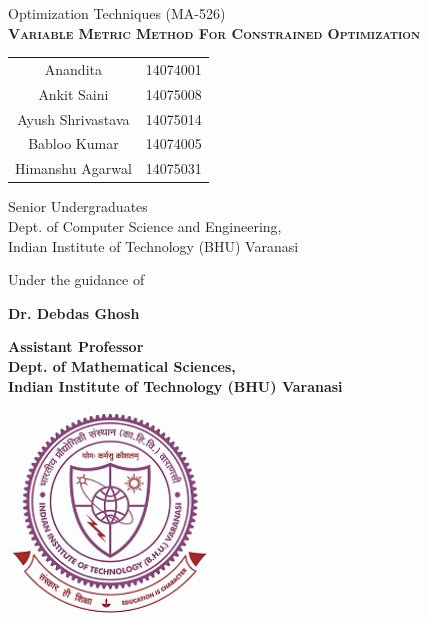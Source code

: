 \documentclass{article}
\begin{document}
\begin{titlepage}
    \begin{center}
        \vspace*{1cm}

        \large{Optimization Techniques (MA-526)}\\
        \Large{\textsc{\textbf{Variable Metric Method For Constrained Optimization}}}

        \vspace{1cm}

        \begin{table}[htbp]
    	\centering
    		\begin{tabular}{cc}
             Anandita & 14074001 \\
			 Ankit Saini & 14075008      \\        
             Ayush Shrivastava & 14075014\\
             Babloo Kumar & 14074005 \\
             Himanshu Agarwal & 14075031
            \end{tabular}
 		\end{table}

		\small{Senior Undergraduates\\
        Dept. of Computer Science and Engineering,\\
        Indian Institute of Technology (BHU) Varanasi}

		\vspace{1cm}

        \small{Under the guidance of}

        \vspace{0.5cm}

        \large{\textbf{Dr. Debdas Ghosh}}

        \vspace{0.5cm}

        \normalsize{\textbf{Assistant Professor\\
        Dept. of Mathematical Sciences,\\
        Indian Institute of Technology (BHU) Varanasi}}

        \vspace{1cm}

        \includegraphics[width=0.4\textwidth]{iitbhu.png}

        \vspace{1cm}
    \end{center}
\end{titlepage}
\end{document}
